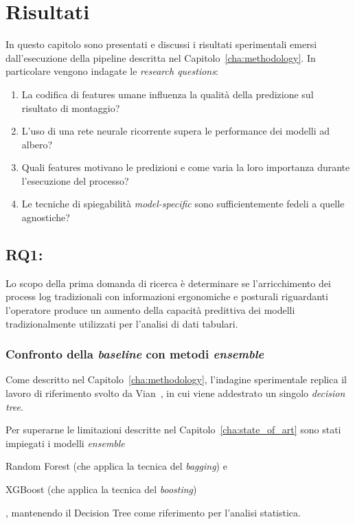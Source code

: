 \chapter{Risultati}
\label{cha:results}

In questo capitolo sono presentati e discussi i risultati sperimentali emersi dall'esecuzione della pipeline descritta nel Capitolo~\ref{cha:methodology}. In particolare vengono indagate le \textit{research questions}:
\begin{enumerate}[label=\textbf{RQ\arabic*}]
    \item La codifica di features umane influenza la qualità della predizione sul risultato di montaggio?
    \item L'uso di una rete neurale ricorrente supera le performance dei modelli ad albero?
    \item Quali features motivano le predizioni e come varia la loro importanza durante l'esecuzione del processo?
    \item Le tecniche di spiegabilità \textit{model-specific} sono sufficientemente fedeli a quelle agnostiche?
\end{enumerate}

\section{RQ1:}
\label{sec:rq1_tree_models}
Lo scopo della prima domanda di ricerca è determinare se l'arricchimento dei process log tradizionali con informazioni ergonomiche e posturali riguardanti l'operatore produce un aumento della capacità predittiva dei modelli tradizionalmente utilizzati per l'analisi di dati tabulari.

\subsection{Confronto della \textit{baseline} con metodi \textit{ensemble}}
\label{subsec:rq1_baseline_vs_ensemble}
Come descritto nel Capitolo~\ref{cha:methodology}, l'indagine sperimentale replica il lavoro di riferimento svolto da Vian~\cite{ppm-human-centered-vian2024}, in cui viene addestrato un singolo \textit{decision tree}.

Per superarne le limitazioni descritte nel Capitolo~\ref{cha:state_of_art} sono stati impiegati i modelli \textit{ensemble}
\begin{enumerate*}[label=(\roman*)]
    \item Random Forest (che applica la tecnica del \textit{bagging}) e
    \item XGBoost (che applica la tecnica del \textit{boosting})
\end{enumerate*}, mantenendo il Decision Tree come riferimento per l'analisi statistica.


